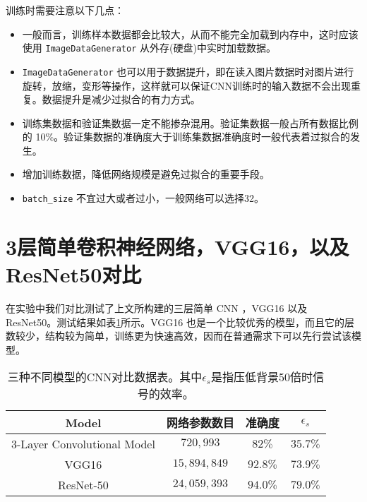 \vspace{0.5cm}

训练时需要注意以下几点：

\begin{itemize}
    \item 一般而言，训练样本数据都会比较大，从而不能完全加载到内存中，这时应该使用 \verb|ImageDataGenerator| 从外存(硬盘)中实时加载数据。
    \item \verb|ImageDataGenerator| 也可以用于数据提升，即在读入图片数据时对图片进行旋转，放缩，变形等操作，这样就可以保证CNN训练时的输入数据不会出现重复。数据提升是减少过拟合的有力方式。
    \item 训练集数据和验证集数据一定不能掺杂混用。验证集数据一般占所有数据比例的 10\%。验证集数据的准确度大于训练集数据准确度时一般代表着过拟合的发生。
    \item 增加训练数据，降低网络规模是避免过拟合的重要手段。
    \item \verb|batch_size| 不宜过大或者过小，一般网络可以选择32。
\end{itemize}


\section{3层简单卷积神经网络，VGG16，以及ResNet50对比}
\label{section:resnet_compare}

在实验中我们对比测试了上文所构建的三层简单 CNN ，VGG16 以及 ResNet50。测试结果如表\ref{tab:cnn_compare}所示。VGG16 也是一个比较优秀的模型，而且它的层数较少，结构较为简单，训练更为快速高效，因而在普通需求下可以先行尝试该模型。
\renewcommand\arraystretch{1.4}
\begin{table}[hbt]
    \centering
    \begin{tabular}{cccc}
      \hline
      Model & 网络参数数目 & 准确度 & $\epsilon_{s}$ \\\hline
      3-Layer Convolutional Model & $720,993$ & $82\%$  & $35.7\%$ \\
      VGG16 & $15,894,849$ & $92.8\%$  & $73.9\%$ \\
      ResNet-50 & $24,059,393$ & $94.0\%$ & $79.0\%$ \\\hline
    \end{tabular}
    \caption{三种不同模型的CNN对比数据表。其中$\epsilon_{s}$是指压低背景50倍时信号的效率。}
    \label{tab:cnn_compare}
  \end{table}
  
  
